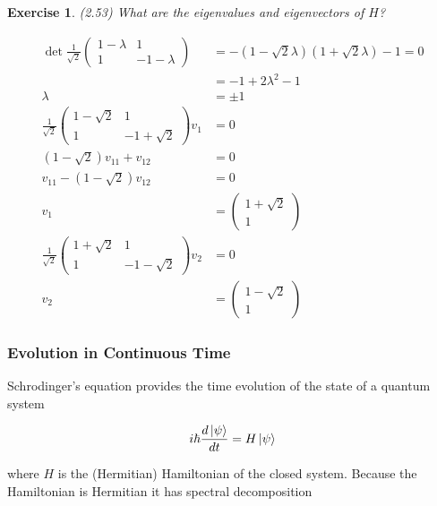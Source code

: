 \documentclass[11pt]{article}
\newcommand\0{\mathbf{0}}
\newcommand\<{\langle}
\renewcommand\>{\rangle}
\newtheorem{exercise}[theorem]{Exercise}
\begin{document}
\begin{exercise}
(2.53) What are the eigenvalues and eigenvectors of $H$?

\begin{align*}
\det \frac{1}{\sqrt{2}}\begin{pmatrix} 1 - \lambda & 1 \\ 1 & -1 - \lambda\end{pmatrix}
&= -(1-\sqrt{2}\lambda)(1+\sqrt{2}\lambda) - 1 = 0 \\
&= -1 + 2\lambda^2 -1 \\
\lambda &= \pm 1 \\
\frac{1}{\sqrt{2}}\begin{pmatrix} 1-\sqrt{2} & 1 \\ 1 & -1 +\sqrt{2}\end{pmatrix}v_1 &= 0 \\
(1-\sqrt{2})v_{11} + v_{12} &= 0 \\
v_{11} -(1-\sqrt{2})v_{12} &= 0 \\
v_1 &= \begin{pmatrix} 1 + \sqrt{2} \\ 1\end{pmatrix} \\
\frac{1}{\sqrt{2}}\begin{pmatrix} 1+\sqrt{2} & 1 \\ 1 & -1 -\sqrt{2}\end{pmatrix}v_2 &= 0 \\ 
v_2 &= \begin{pmatrix} 1 - \sqrt{2} \\ 1\end{pmatrix}
\end{align*}
	
\end{exercise}

\subsubsection{Evolution in Continuous Time}\label{post-cts-evol}

Schrodinger's equation provides the time evolution of the state of a quantum system

\begin{align}\label{schro-cts}
i\hbar \frac{d\ket{\psi}}{dt} = H\ket{\psi}	
\end{align}

where $H$ is the (Hermitian) Hamiltonian of the closed system. Because the Hamiltonian is Hermitian it has spectral decomposition 
\end{document}
